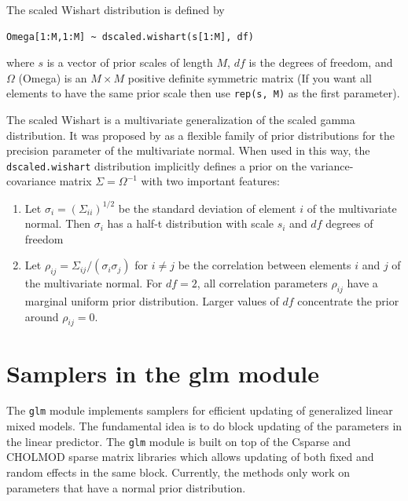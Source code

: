 \documentclass[11pt, a4paper, titlepage]{report}
\begin{document}
The scaled Wishart distribution is defined by
\begin{verbatim}
Omega[1:M,1:M] ~ dscaled.wishart(s[1:M], df)
\end{verbatim}
where $s$ is a vector of prior scales of length $M$, $df$ is the
degrees of freedom, and $\Omega$ (Omega) is an $M \times M$ positive
definite symmetric matrix (If you want all elements to have the
same prior scale then use \texttt{rep(s, M)} as the first parameter).

The scaled Wishart is a multivariate generalization of the scaled
gamma distribution. It was proposed by \citet{HuangWand2013} as a flexible
family of prior distributions for the precision parameter of the
multivariate normal. When used in this way, the
\texttt{dscaled.wishart} distribution implicitly defines a prior on
the variance-covariance matrix $\Sigma = \Omega^{-1}$ with two
important features:
\begin{enumerate}
\item Let $\sigma_i = (\Sigma_{ii})^{1/2}$ be the standard deviation of
  element $i$ of the multivariate normal. Then $\sigma_i$ has a
  half-t distribution with scale $s_i$ and $df$ degrees of freedom
\item Let $\rho_{ij} = \Sigma_{ij}/(\sigma_i \sigma_j)$ for $i \neq j$
  be the correlation between elements $i$ and $j$ of the multivariate
  normal. For $df=2$, all correlation parameters $\rho_{ij}$ have a
  marginal uniform prior distribution. Larger values of $df$
  concentrate the prior around $\rho_{ij} = 0$.
\end{enumerate}


\section{Samplers in the glm module}
\label{section:glm::samplers}

The \texttt{glm} module implements samplers for efficient updating of
generalized linear mixed models.  The fundamental idea is to do block
updating of the parameters in the linear predictor.  The \texttt{glm}
module is built on top of the \textsf{Csparse} and \textsf{CHOLMOD}
sparse matrix libraries \citep{Davis2006, Davis1999} which allows
updating of both fixed and random effects in the same
block. Currently, the methods only work on parameters that have a
normal prior distribution.
\end{document}
